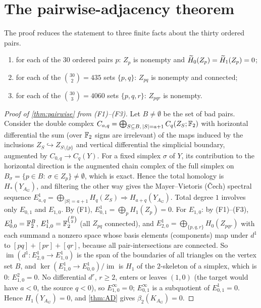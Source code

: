 \section{The pairwise-adjacency theorem}
The proof reduces the statement to three finite facts about the thirty ordered pairs.
\begin{enumerate}[label=(F\arabic*)]
\item for each of the $30$ ordered pairs $p$: $Z_p$ is nonempty and $\widetilde{H}_0(Z_p)=\widetilde{H}_1(Z_p)=0$;
\item for each of the $\binom{30}{2}=435$ sets $\{p,q\}$: $Z_{pq}$ is nonempty and connected;
\item for each of the $\binom{30}{3}=4060$ sets $\{p,q,r\}$: $Z_{pqr}$ is nonempty.
\end{enumerate}
\begin{proof}[Proof of \cref{thm:pairwise} from (F1)--(F3)]
Let $B\neq\emptyset$ be the set of bad pairs. Consider the double complex $C_{a,q}=\bigoplus_{S\subseteq B,\,|S|=a+1}C_q(Z_S;\mathbb{F}_2)$ with horizontal differential the sum (over $\mathbb{F}_2$ signs are irrelevant) of the maps induced by the inclusions $Z_S\hookrightarrow Z_{S\setminus\{p\}}$ and vertical differential the simplicial boundary, augmented by $C_{0,q}\to C_q(Y)$. For a fixed simplex $\sigma$ of $Y$, its contribution to the horizontal direction is the augmented chain complex of the full simplex on $B_\sigma=\{p\in B:\ \sigma\in Z_p\}\neq\emptyset$, which is exact. Hence the total homology is $H_*(Y_{A_G})$, and filtering the other way gives the Mayer--Vietoris (\v Cech) spectral sequence $E^1_{a,q}=\bigoplus_{|S|=a+1}H_q(Z_S)\Rightarrow H_{a+q}(Y_{A_G})$.
Total degree $1$ involves only $E_{0,1}$ and $E_{1,0}$. By (F1), $E^1_{0,1}=\bigoplus_pH_1(Z_p)=0$. For $E_{1,0}$: by (F1)--(F3), $E^1_{0,0}=\mathbb{F}_2^B$, $E^1_{1,0}=\mathbb{F}_2^{\binom B2}$ (all $Z_{pq}$ connected), and $E^1_{2,0}=\bigoplus_{\{p,q,r\}}H_0(Z_{pqr})$ with each summand a nonzero space whose basis elements (components) map under $d^1$ to $[pq]+[pr]+[qr]$, because all pair-intersections are connected. So $\operatorname{im}(d^1:E^1_{2,0}\to E^1_{1,0})$ is the span of the boundaries of all triangles on the vertex set $B$, and $\ker(E^1_{1,0}\to E^1_{0,0})/\operatorname{im}$ is $H_1$ of the $2$-skeleton of a simplex, which is $0$: $E^2_{1,0}=0$. No differential $d^r$, $r\ge2$, enters or leaves $(1,0)$ (the target would have $a<0$, the source $q<0$), so $E^\infty_{1,0}=0$; $E^\infty_{0,1}$ is a subquotient of $E^1_{0,1}=0$. Hence $H_1(Y_{A_G})=0$, and \cref{thm:AD} gives $\beta_2(K_{A_G})=0$.
\end{proof}
